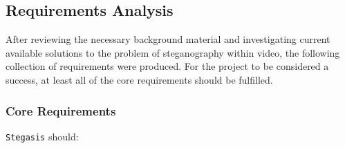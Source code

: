 \documentclass[paper=a4, fontsize=11pt,twoside]{scrartcl}    %
\numberwithin{table}{section}
\numberwithin{figure}{section}
\begin{document}
\subsection{Requirements Analysis}

After reviewing the necessary background material and investigating current available solutions to the problem of steganography within video, the following collection of requirements were produced. For the project to be considered a success, at least all of the core requirements should be fulfilled.

\subsubsection{Core Requirements}

\texttt{Stegasis} should:
\end{document}
